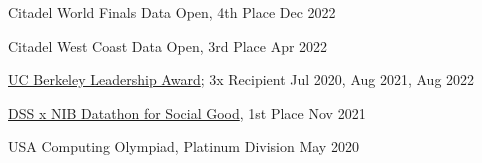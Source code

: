 Citadel World Finals Data Open, 4th Place \hfill Dec 2022\par
Citadel West Coast Data Open, 3rd Place \hfill Apr 2022\par
\href{https://alumni.berkeley.edu/community/scholarships/leadership-award}{UC Berkeley Leadership Award}; 3x Recipient \hfill Jul 2020, Aug 2021, Aug 2022 \par
\href{https://www.facebook.com/events/933047190947185?}{DSS x NIB Datathon for Social Good}, 1st Place \hfill Nov 2021\par
USA Computing Olympiad, Platinum Division \hfill May 2020\par